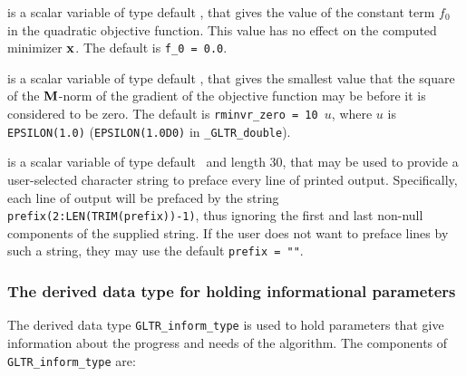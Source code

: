 \documentclass{galahad}
\newcommand{\packagename}{GL\-TR}
\newcommand{\fullpackagename}{\libraryname\_\packagename}
\begin{document}
\begin{description}
 is a scalar variable of type default
\realdp, that gives the value of the constant term $f_0$ in the
quadratic objective function. This value has no effect on the
computed minimizer ${\mathbf{x}}$. The default is {\tt f\_0 = 0.0}.

 is a scalar variable of type default
\realdp, that gives the smallest value that the square of the ${\mathbf{M}}$-norm of the
gradient of the objective function may be before it is considered to be zero.
The default is {\tt rminvr\_zero = 10 $u$},
where $u$ is {\tt EPSILON(1.0)} ({\tt EPSILON(1.0D0)} in
{\tt \fullpackagename\_double}).

 is a scalar variable of type default \character\
and length 30, that may be used to provide a user-selected
character string to preface every line of printed output.
Specifically, each line of output will be prefaced by the string
{\tt prefix(2:LEN(TRIM(prefix))-1)},
thus ignoring the first and last non-null components of the
supplied string. If the user does not want to preface lines by such
a string, they may use the default {\tt prefix = ""}.

\end{description}


\subsubsection{The derived data type for holding informational
 parameters}\label{typeinfo}
The derived data type
{\tt \packagename\_inform\_type}
is used to hold parameters that give information about the progress and needs
of the algorithm. The components of
{\tt \packagename\_inform\_type}
are:
\end{document}
